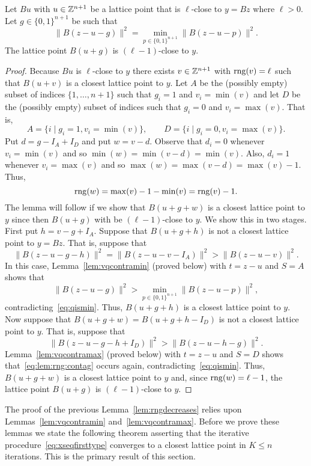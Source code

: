 \documentclass[final,leqno]{siamltex}
\begin{document}
\begin{lemma}\label{lem:rngdecreases}
Let $Bu$ with $u \in {\mathbb Z}^{n+1}$ be a lattice point that is $\ell$-close to $y = Bz$ where $\ell > 0$.  Let $g \in \{0,1\}^{n+1}$ be such that
\begin{equation}\label{eq:qismin}
\|B(z - u - g)\|^2 = \min_{p \in \{0,1\}^{n+1}}\|B(z - u - p)\|^2.
\end{equation}
The lattice point $B(u+g)$ is $(\ell-1)$-close to $y$.
\end{lemma}
\begin{proof}
Because $Bu$ is $\ell$-close to $y$ there exists $v \in {\mathbb Z}^{n+1}$ with $\operatorname{rng}(v) = \ell$ such that $B(u+v)$ is a closest lattice point to $y$.  Let $A$ be the (possibly empty) subset of indices $\{1,\dots,n+1\}$ such that $g_i = 1$ and $v_i = \min(v)$ and let $D$ be the (possibly empty) subset of indices such that $g_i = 0$ and $v_i = \max(v)$. That is,
\[
A = \{i \mid g_i = 1, v_i = \min(v) \}, \qquad D = \{i \mid g_i = 0, v_i = \max(v) \}.
\]
Put $d = g - I_A + I_D$ and put $w = v - d$.  Observe that $d_i = 0$ whenever $v_i = \min(v)$ and so $\min(w) = \min(v-d) = \min(v)$.  Also, $d_i = 1$ whenever $v_i = \max(v)$ and so $\max(w) = \max(v-d) = \max(v) - 1$.  Thus,
\[
\operatorname{rng}(w) = \max(v) - 1 - \min(v) = \operatorname{rng}(v) - 1.
\]
The lemma will follow if we show that $B(u+g+w)$ is a closest lattice point to $y$ since then $B(u+g)$ with be $(\ell-1)$-close to $y$.  We show this in two stages.  First put $h = v - g + I_A$.  Suppose that $B(u+g+h)$ is not a closest lattice point to $y = Bz$.  That is, suppose that 
\[
\|B(z-u-g-h)\|^2 = \|B(z-u-v-I_A)\|^2 > \|B(z-u-v)\|^2.
\]
In this case, Lemma~\ref{lem:vqcontramin} (proved below) with $t = z-u$ and $S = A$ shows that 
\begin{equation}\label{eq:lem:rng:contag}
\|B(z-u - g)\|^2 > \min_{p \in \{0,1\}^{n+1}}\|B(z- u - p)\|^2,
\end{equation}
contradicting~\eqref{eq:qismin}.  Thus, $B(u+g+h)$ is a closest lattice point to $y$.  Now suppose that $B(u+g+w) = B(u+g+h-I_D)$ is not a closest lattice point to $y$.  That is, suppose that
\[
\|B(z-u-g-h+I_D)\|^2 > \|B(z-u-h-g)\|^2.
\]
Lemma~\ref{lem:vqcontramax} (proved below) with $t = z-u$ and $S = D$ shows that~\eqref{eq:lem:rng:contag} occurs again, contradicting~\eqref{eq:qismin}.  Thus, $B(u+g+w)$ is a closest lattice point to $y$ and, since $\operatorname{rng}(w) = \ell-1$, the lattice point $B(u+g)$ is $(\ell-1)$-close to $y$.
 \end{proof}

The proof of the previous Lemma~\ref{lem:rngdecreases} relies upon Lemmas~\ref{lem:vqcontramin} and~\ref{lem:vqcontramax}.  Before we prove these lemmas we state the following theorem asserting that the iterative procedure~\eqref{eq:xseqfirsttype} converges to a closest lattice point in $K \leq n$ iterations.  This is the primary result of this section.
\end{document}
